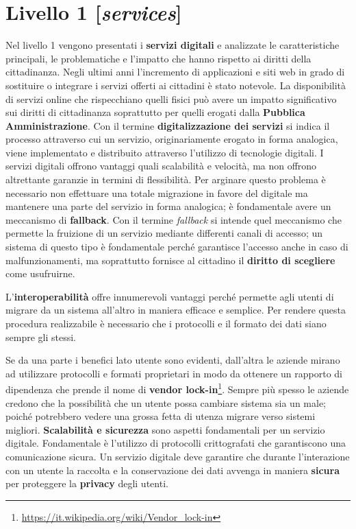 \chapter{Livello 1 [\emph{services}]}
Nel livello 1 vengono presentati i \textbf{servizi digitali} e analizzate le caratteristiche principali, le problematiche e l'impatto che hanno rispetto ai diritti della cittadinanza.
Negli ultimi anni l'incremento di applicazioni e siti web in grado di sostituire o integrare i servizi offerti ai cittadini è stato notevole.
La disponibilità di servizi online che rispecchiano quelli fisici può avere un impatto significativo sui diritti di cittadinanza soprattutto per quelli erogati dalla \textbf{Pubblica Amministrazione}.
\bigbreak
Con il termine \textbf{digitalizzazione dei servizi} si indica il processo attraverso cui un servizio, originariamente erogato in forma analogica, viene implementato e distribuito attraverso l'utilizzo di tecnologie digitali. I servizi digitali offrono vantaggi quali scalabilità e velocità, ma non offrono altrettante garanzie in termini di flessibilità. 
Per arginare questo problema è necessario non effettuare una totale migrazione in favore del digitale ma mantenere una parte del servizio in forma analogica; è fondamentale avere un meccanismo di \textbf{fallback}. Con il termine \emph{fallback} si intende quel meccanismo che permette la fruizione di un servizio mediante differenti canali di accesso; un sistema di questo tipo è fondamentale perché garantisce l'accesso anche in caso di malfunzionamenti, ma soprattutto fornisce al cittadino il \textbf{diritto di scegliere} come usufruirne.

\bigbreak
L'\textbf{interoperabilità} offre innumerevoli vantaggi perché permette agli utenti  di migrare da un sistema all'altro in maniera efficace e semplice. Per rendere questa procedura realizzabile è necessario che i protocolli e il formato dei dati siano sempre gli stessi.

Se da una parte i benefici lato utente sono evidenti, dall'altra le aziende mirano ad utilizzare protocolli e formati proprietari in modo da ottenere un rapporto di dipendenza che prende il nome di \textbf{vendor lock-in}\footnote{\url{https://it.wikipedia.org/wiki/Vendor_lock-in}}. Sempre più spesso le aziende credono che la possibilità che un utente possa cambiare sistema sia un male; poiché potrebbero vedere una grossa fetta di utenza migrare verso sistemi migliori.
\bigbreak
\textbf{Scalabilità e sicurezza} sono aspetti fondamentali per un servizio digitale. Fondamentale è l'utilizzo di protocolli crittografati che garantiscono una comunicazione sicura. Un servizio digitale deve garantire che durante l'interazione con un utente la raccolta e la conservazione dei dati avvenga in maniera \textbf{sicura} per proteggere la \textbf{privacy} degli utenti. 


